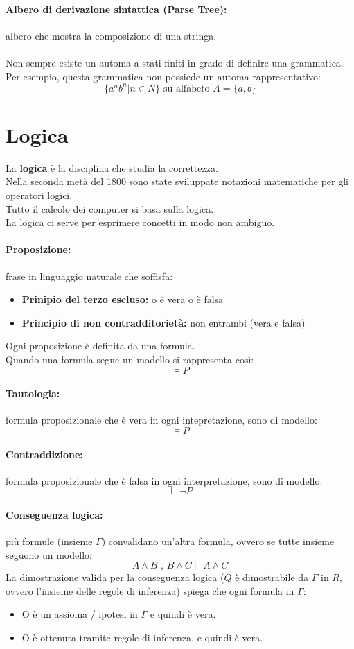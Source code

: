 \documentclass[a4paper,12pt]{article}
\let\oldsection\section
\renewcommand{\section}{\clearpage\oldsection}
\begin{document}
\paragraph{Albero di derivazione sintattica (Parse Tree): } albero che mostra la composizione di una stringa.\\\\
Non sempre esiste un automa a stati finiti in grado di definire una grammatica. Per esempio, questa grammatica non possiede un automa rappresentativo:
\[
\{a^nb^n | n \in N\} \text{ su alfabeto } A = \{a,b\}
\]

\section{Logica}
La \textbf{logica} è la disciplina che studia la correttezza.\\
Nella seconda metà del 1800 sono state sviluppate notazioni matematiche per gli operatori logici.\\
Tutto il calcolo dei computer si basa sulla logica.\\
La logica ci serve per esprimere concetti in modo non ambiguo.
\paragraph{Proposizione: } frase in linguaggio naturale che soffisfa:
\begin{itemize}
    \item \textbf{Prinipio del terzo escluso: } o è vera o è falsa
    \item \textbf{Principio di non contradditorietà: } non entrambi (vera e falsa)
\end{itemize}
Ogni proposizione è definita da una formula.\\
Quando una formula segue un modello si rappresenta così:
\[
\models P
\]
\paragraph{Tautologia: }formula proposizionale che è vera in ogni intepretazione, sono di modello:
\[
\models P
\]
\paragraph{Contraddizione: }formula proposizionale che è falsa in ogni interpretazione, sono di modello:
\[
\models \lnot P
\]
\paragraph{Conseguenza logica: } più formule (insieme $\Gamma$) convalidano un'altra formula, ovvero se tutte insieme seguono un modello:
\[
A \land B \text{ , } B \land C \models A \land C
\]
La dimostrazione valida per la conseguenza logica ($Q$ è dimostrabile da $\Gamma$ in $R$, ovvero l'insieme delle regole di inferenza) spiega che ogni formula in $\Gamma$:
\begin{itemize}
    \item O è un assioma / ipotesi in $\Gamma$ e quindi è vera.
    \item O è ottenuta tramite regole di inferenza, e quindi è vera.
\end{itemize}
\end{document}
